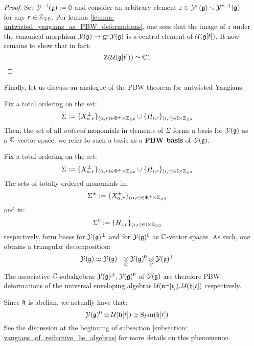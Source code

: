             \begin{proof}
                Set $\mathcal{Y}^{-1}(\mathfrak{g}) := 0$ and consider an arbitrary element $z \in \mathcal{Y}^r(\mathfrak{g}) \smallsetminus \mathcal{Y}^{r - 1}(\mathfrak{g})$ for any $r \in \mathbb{Z}_{\geqslant 0}$. Per lemma \ref{lemma: untwisted_yangians_as_PBW_deformations}, one sees that the image of $z$ under the canonical morphism $\mathcal{Y}(\mathfrak{g}) \to \operatorname{gr} \mathcal{Y}(\mathfrak{g})$ is a central element of $\mathcal{U}(\mathfrak{g}[t])$. It now remains to show that in fact:
                    $$\mathrm{Z}( \mathcal{U}(\mathfrak{g}[t]) ) \simeq \mathbb{C} 1$$
            \end{proof}

        Finally, let us discuss an analogue of the PBW theorem for untwisted Yangians.
        \begin{theorem} \label{theorem: PBW_bases_for_untwisted_yangians}
            \cite[Proposition 12.1.8]{chari_pressley_quantum_groups} Fix a total ordering on the set:
                $$\Sigma := \{X_{\alpha, r}^{\pm}\}_{(\alpha, r) \in \Phi^+ \x \Z_{\geq 0}} \cup \{H_{i, r}\}_{(i, r) \in \simpleroots \x \Z_{\geq 0}}$$
            Then, the set of all \textit{ordered} monomials in elements of $\Sigma$ forms a basis for $\mathcal{Y}(\mathfrak{g})$ as a $\mathbb{C}$-vector space; we refer to such a basis as a \textbf{PBW basis} of $\mathcal{Y}(\mathfrak{g})$. 
        \end{theorem}
        \begin{corollary} \label{coro: triangular_decompositions_of_untwisted_yangians}
            Fix a total ordering on the set:
                $$\Sigma := \{X_{\alpha, r}^{\pm}\}_{(\alpha, r) \in \Phi^+ \x \Z_{\geq 0}} \cup \{H_{i, r}\}_{(i, r) \in \simpleroots \x \Z_{\geq 0}}$$
            The sets of totally ordered monomials in:
                $$\Sigma^{\pm} := \{X_{\alpha, r}^{\pm}\}_{(\alpha, r) \in \Phi^+ \x \Z_{\geq 0}}$$
            and in:
                $$\Sigma^0 := \{H_{i, r}\}_{(i, r) \in \simpleroots \x \Z_{\geq 0}}$$
            respectively, form bases for $\mathcal{Y}(\mathfrak{g})^{\pm}$ and for $\mathcal{Y}(\mathfrak{g})^0$ as $\mathbb{C}$-vector spaces. As such, one obtains a triangular decomposition:
                $$\calY(\g) \cong \calY(\g)^- \tensor_{\bbC} \calY(\g)^0 \tensor_{\bbC} \calY(\g)^+$$
            The associative $\mathbb{C}$-subalgebras $\mathcal{Y}(\mathfrak{g})^{\pm}, \mathcal{Y}(\mathfrak{g})^0$ of $\mathcal{Y}(\mathfrak{g})$ are therefore PBW deformations of the universal enveloping algebras $\mathcal{U}(\mathfrak{n}^{\pm}[t]), \mathcal{U}(\mathfrak{h}[t])$ respectively. 
        \end{corollary}
        \begin{remark}
            Since $\mathfrak{h}$ is abelian, we actually have that:
                $$\mathcal{Y}(\mathfrak{g})^0 \simeq \mathcal{U}(\mathfrak{h}[t]) \simeq \mathrm{Sym}(\mathfrak{h}[t])$$
            See the discussion at the beginning of subsection \ref{subsection: yangians_of_reductive_lie_algebras} for more details on this phenomenon. 
        \end{remark}

